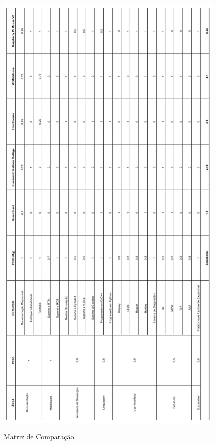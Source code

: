\begin{table}[H]
	\centering
	\includegraphics[width=110mm]
	{Figures/MatrizComp_v.png}
	\caption{\label{tab:MatrizComp} Matriz de Comparação.}
\end{table}